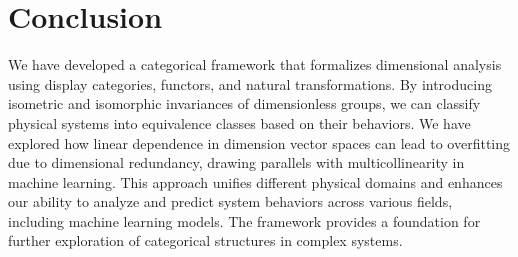 \documentclass{article}
\theoremstyle{definition}
\theoremstyle{remark}
\begin{document}
	\section{Conclusion}
	
	We have developed a categorical framework that formalizes dimensional analysis using display categories, functors, and natural transformations. By introducing isometric and isomorphic invariances of dimensionless groups, we can classify physical systems into equivalence classes based on their behaviors. We have explored how linear dependence in dimension vector spaces can lead to overfitting due to dimensional redundancy, drawing parallels with multicollinearity in machine learning. This approach unifies different physical domains and enhances our ability to analyze and predict system behaviors across various fields, including machine learning models. The framework provides a foundation for further exploration of categorical structures in complex systems.
	
\end{document}
